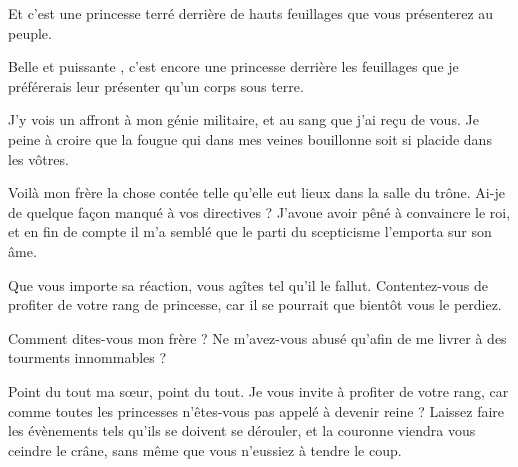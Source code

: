 \begin{drama}
  \elaspeaks Et c’est une princesse terré derrière de hauts feuillages que vous présenterez au peuple.

  \roispeaks Belle et puissante \princesse{}, c’est encore une princesse derrière les feuillages que je préférerais leur présenter qu’un corps sous terre.

  \elaspeaks J’y vois un affront à mon génie militaire, et au sang que j’ai reçu de vous. Je peine à croire que la fougue qui dans mes veines bouillonne soit si placide dans les vôtres.


\end{drama}

\scene

\StageDirII{\elena, \ela}

%

\begin{drama}
  \elaspeaks Voilà mon frère la chose contée telle qu’elle eut lieux dans la salle du trône. Ai-je de quelque façon manqué à vos directives ? J’avoue avoir pêné à convaincre le roi, et en fin de compte il m’a semblé que le parti du scepticisme l’emporta sur son âme.

  \elenaspeaks Que vous importe sa réaction, vous agîtes tel qu’il le fallut. Contentez-vous de profiter de votre rang de princesse, car il se pourrait que bientôt vous le perdiez.

  \elaspeaks Comment dites-vous mon frère ? Ne m’avez-vous abusé qu’afin de me livrer à des tourments innommables ?

  \elenaspeaks Point du tout ma sœur, point du tout. Je vous invite à profiter de votre rang, car comme toutes les princesses n’êtes-vous pas appelé à devenir reine ? Laissez faire les évènements tels qu’ils se doivent se dérouler, et la couronne viendra vous ceindre le crâne, sans même que vous n’eussiez à tendre le coup.
\end{drama}

\scene

\StageDirII{\reine, \roi}


